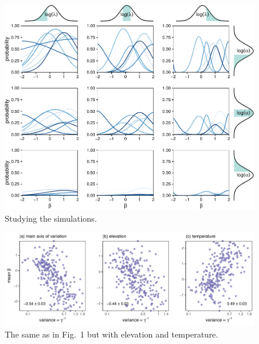 \documentclass[11pt, a4paper]{article}
\begin{document}
\clearpage

\begin{figure}[ht]
  \centering
    \vspace{0.5cm}
    \includegraphics[width=1\textwidth]{figures/prior}
    	  \vspace{0.3cm}
	   \caption{Studying the simulations.}
      \label{sfig:simulations}
\end{figure}

\clearpage

\begin{figure}[ht]
  \centering
    \vspace{0.5cm}
    \includegraphics[width=1\textwidth]{figures/pca-elevation-temperature}
    	  \vspace{0.3cm}
	   \caption{The same as in Fig.~1 but with elevation and temperature.}
      \label{sfig:temperature-elevation}
\end{figure}

\clearpage
\end{document}
